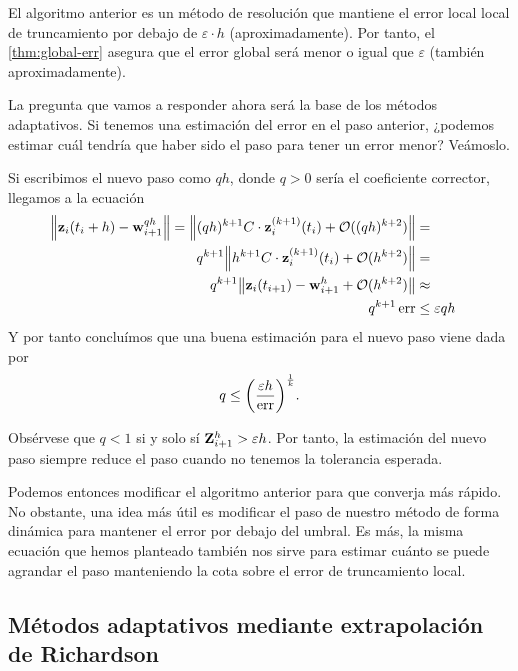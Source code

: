 \begin{remark}
    El algoritmo anterior es un método de resolución
    que mantiene el error local local de truncamiento
    por debajo de $\varepsilon\cdot h$ (aproximadamente).
    Por tanto, el \cref{thm:global-err} asegura que el error global será
    menor o igual que $\varepsilon$ (también aproximadamente).
\end{remark}

La pregunta que vamos a responder ahora será la base de los métodos adaptativos.
Si tenemos una estimación del error en el paso anterior,
¿podemos estimar cuál tendría que haber sido el paso para tener un error menor?
Veámoslo.

Si escribimos el nuevo paso como $qh$,
donde $q > 0$ sería el coeficiente corrector,
llegamos a la ecuación
\begin{align*}
    \norm{\vb{z}{}_i(t_i + h) - \vb{w}{}^{qh}_{i+1}} =
    \norm{(qh)^{k+1}C\cdot \vb{z}{}_i^{(k+1)}(t_i) + \vb{\mathcal{O}}{}((qh)^{k+2})} = {} \\
    q^{k+1}\norm{h^{k+1}C\cdot \vb{z}{}_i^{(k+1)}(t_i) + \vb{\mathcal{O}}{}(h^{k+2})} = {} \\
    q^{k+1}\norm{\vb{z}{}_i(t_{i+1}) - \vb{w}{}^h_{i+1} + \vb{\mathcal{O}}{}(h^{k+2})} \approx {} \\
    q^{k+1}\operatorname{err} \le {} & \varepsilon qh
\end{align*}
Y por tanto concluímos que una buena estimación para el nuevo paso
viene dada por
\begin{equation*}
    q \le \qty(\frac{\varepsilon h}{\operatorname{err}})^{\frac{1}{k}}.
\end{equation*}

\begin{remark}
    Obsérvese que $q < 1$ si y solo sí $\vb{Z}{}^h_{i+1} > \varepsilon h$.
    Por tanto, la estimación del nuevo paso
    siempre reduce el paso cuando no tenemos la tolerancia esperada.
\end{remark}

Podemos entonces modificar el algoritmo anterior
para que converja más rápido.
No obstante, una idea más útil es
modificar el paso de nuestro método de forma dinámica
para mantener el error por debajo del umbral.
Es más, la misma ecuación que hemos planteado también nos sirve
para estimar cuánto se puede agrandar el paso
manteniendo la cota sobre el error de truncamiento local.


\subsection{Métodos adaptativos mediante extrapolación de Richardson}

